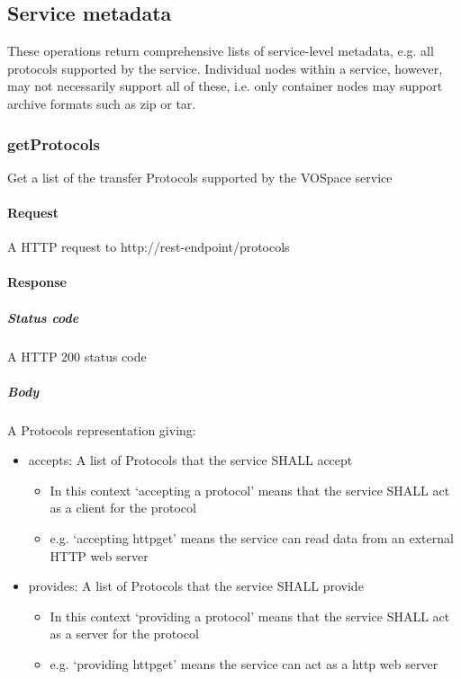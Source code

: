 \documentclass[11pt,a4paper]{ivoa}
\begin{document}
\subsection{Service metadata}
\label{subsec:service metadata}
These operations return comprehensive lists of service-level metadata, e.g. all protocols supported by the service. Individual nodes within a service, however, may not necessarily support all of these, i.e. only container nodes may support archive formats such as zip or tar.

\subsubsection{getProtocols}
\label{subsubsec:getprotocols}
Get a list of the transfer Protocols supported by the VOSpace service

\paragraph{Request}
A HTTP request to http://rest-endpoint/protocols

\paragraph{Response}
\subparagraph{Status code} A HTTP 200 status code
\subparagraph{Body}
A Protocols representation giving:
\begin{itemize}
    \item accepts: A list of Protocols that the service SHALL accept
    \begin{itemize}
        \item In this context `accepting a protocol' means that the service SHALL act as a client for the protocol
        \item e.g. `accepting httpget' means the service can read data from an external HTTP web server
    \end{itemize}
    \item provides: A list of Protocols that the service SHALL provide
    \begin{itemize}
        \item In this context `providing a protocol' means that the service SHALL act as a server for the protocol
        \item e.g. `providing httpget' means the service can act as a http web server
    \end{itemize}
\end{itemize}
\end{document}
